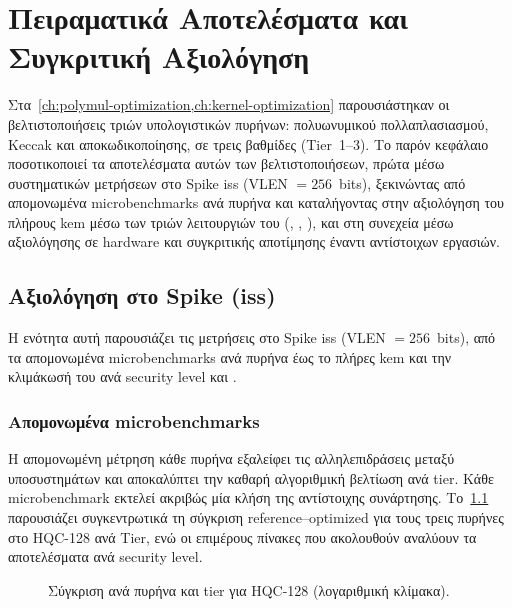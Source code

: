 \chapter{Πειραματικά Αποτελέσματα και Συγκριτική Αξιολόγηση}
\label{ch:results}

Στα~\cref{ch:polymul-optimization,ch:kernel-optimization} παρουσιάστηκαν
οι βελτιστοποιήσεις τριών υπολογιστικών πυρήνων: πολυωνυμικού πολλαπλασιασμού,
Keccak και αποκωδικοποίησης, σε τρεις βαθμίδες (Tier~1–3). Το παρόν
κεφάλαιο ποσοτικοποιεί τα αποτελέσματα αυτών των βελτιστοποιήσεων, πρώτα μέσω
συστηματικών μετρήσεων \instret στο Spike \gls{iss} (VLEN $= \num{256}$~bits),
ξεκινώντας από απομονωμένα microbenchmarks ανά πυρήνα και καταλήγοντας
στην αξιολόγηση του πλήρους \gls{kem} μέσω των τριών λειτουργιών του 
(\KeyGen, \Encaps, \Decaps), και στη συνεχεία μέσω αξιολόγησης σε 
hardware και συγκριτικής αποτίμησης έναντι αντίστοιχων εργασιών.

\section{Αξιολόγηση στο Spike (\gls{iss})}
\label{sec:spike-evaluation}

Η ενότητα αυτή παρουσιάζει τις μετρήσεις \instret στο Spike \gls{iss}
(VLEN $= \num{256}$~bits), από τα απομονωμένα microbenchmarks ανά πυρήνα
έως το πλήρες \gls{kem} και την κλιμάκωσή του ανά security level και \VLEN.

\subsection{Απομονωμένα microbenchmarks}
\label{sec:microbenchmarks}

Η απομονωμένη μέτρηση κάθε πυρήνα εξαλείφει τις αλληλεπιδράσεις μεταξύ
υποσυστημάτων και αποκαλύπτει την καθαρή αλγοριθμική βελτίωση ανά tier.
Κάθε microbenchmark εκτελεί ακριβώς μία κλήση της αντίστοιχης συνάρτησης. 
Το~\cref{fig:microbench-bar} παρουσιάζει συγκεντρωτικά τη σύγκριση
reference–optimized για τους τρεις πυρήνες στο HQC-128 ανά Tier, ενώ οι επιμέρους
πίνακες που ακολουθούν αναλύουν τα αποτελέσματα ανά security level.

\begin{figure}[htbp]
  \centering
  
  \captionsetup{list=no}
  \caption{Σύγκριση \instret ανά πυρήνα και tier για HQC-128 (λογαριθμική
    κλίμακα).}
  \label{fig:microbench-bar}
\end{figure}

